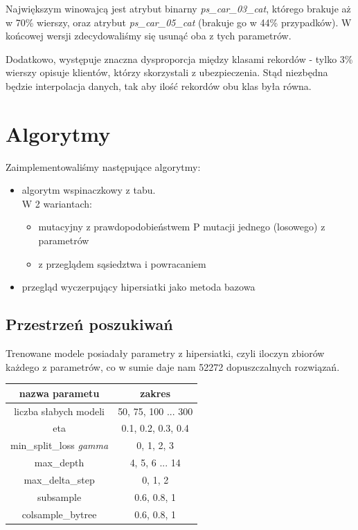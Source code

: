 \documentclass[11pt]{article}
\begin{document}
Największym winowajcą jest atrybut binarny \textsl{ps\_car\_03\_cat}, którego brakuje aż w 70\% wierszy, oraz atrybut \textsl{ps\_car\_05\_cat} (brakuje go w 44\% przypadków). W końcowej wersji zdecydowaliśmy się usunąć oba z tych parametrów.

Dodatkowo, występuje znaczna dysproporcja między klasami rekordów - tylko 3\% wierszy opisuje klientów, którzy skorzystali z ubezpieczenia. Stąd niezbędna będzie interpolacja danych, tak aby ilość rekordów obu klas była równa.

\section{Algorytmy}
Zaimplementowaliśmy następujące algorytmy:
\begin{itemize}
	\item algorytm wspinaczkowy z tabu. \\ 
	W 2 wariantach:
		\begin{itemize}
			\item mutacyjny z prawdopodobieństwem P mutacji jednego (losowego) z parametrów
			\item z przeglądem sąsiedztwa i powracaniem
		\end{itemize}
	\item przegląd wyczerpujący hipersiatki jako metoda bazowa\\
\end{itemize}

\subsection{Przestrzeń poszukiwań}
Trenowane modele posiadały parametry z hipersiatki, czyli iloczyn zbiorów każdego z parametrów, co w sumie daje nam 52272 dopuszczalnych rozwiązań.
\begin{center}
	\begin{tabular}{|c|c|}
		\hline
		nazwa parametu & zakres \\
		\hline
		\hline
		liczba słabych modeli &  50, 75, 100 ... 300\\ %
		\hline
		eta &  0.1, 0.2, 0.3, 0.4\\ %
		\hline 
		min\_split\_loss \textit{gamma} & 0, 1, 2, 3\\ %
		\hline 
		max\_depth & 4, 5, 6 ... 14\\
		\hline 
		max\_delta\_step & 0, 1, 2\\
		\hline 
		subsample & 0.6, 0.8, 1\\
		\hline
		colsample\_bytree &  0.6, 0.8, 1\\ %
		\hline 
	\end{tabular}
\end{center}
\end{document}
